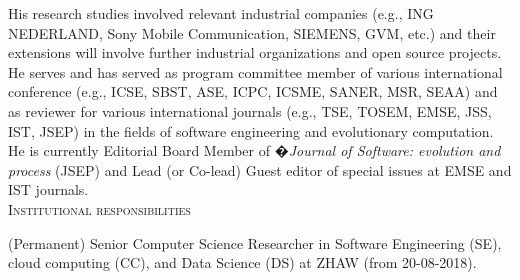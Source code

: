 \documentclass[12pt]{article}
\newcommand{\blankline}{\quad\pagebreak[3]}
\begin{document}
His research studies involved relevant industrial companies (e.g., ING NEDERLAND, Sony Mobile Communication, SIEMENS, GVM, etc.) and their extensions will involve further industrial organizations and open source projects. He serves and has served as program committee member of various international conference (e.g., ICSE, SBST, ASE, ICPC, ICSME, SANER, MSR, SEAA) and as reviewer for various international journals (e.g., TSE, TOSEM, EMSE, JSS, IST, JSEP) in the fields of software engineering and evolutionary computation. He is currently Editorial Board Member of �\textit{Journal of Software: evolution and process} (JSEP) and Lead (or Co-lead) Guest editor of special issues at EMSE and IST journals.\\

\vspace{1.5mm}
\textsc{Institutional responsibilities}
\vspace{1.5mm}

(Permanent) Senior Computer Science Researcher in Software Engineering (SE), cloud computing (CC), and Data Science (DS) at ZHAW (from 20-08-2018).

\end{document}
